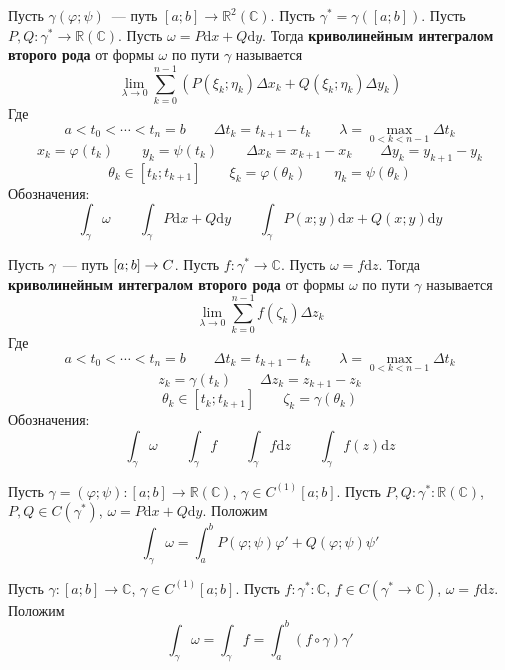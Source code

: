 \documentclass{article}
\begin{document}
    \begin{definition}
        \label{dfn: Удобное определение интеграла вещественной формы}
        Пусть $\gamma(\varphi;\psi)$~--- путь $[a;b]\to\mathbb R^2(\mathbb C)$. Пусть $\gamma^*=\gamma([a;b])$. Пусть $P,Q\colon\gamma^*\to\mathbb R(\mathbb C)$. Пусть $\omega=P\mathrm dx+Q\mathrm dy$. Тогда \textbf{криволинейным интегралом второго рода} от формы $\omega$ по пути $\gamma$ называется
        $$
        \lim\limits_{\lambda\to0}\sum\limits_{k=0}^{n-1}\left(P(\xi_k;\eta_k)\Delta x_k+Q(\xi_k;\eta_k)\Delta y_k\right)
        $$
        Где
        $$
        a<t_0<\cdots<t_n=b\qquad\Delta t_k=t_{k+1}-t_k\qquad\lambda=\max\limits_{0<k<n-1}\Delta t_k
        $$
        $$
        x_k=\varphi(t_k)\qquad y_k=\psi(t_k)\qquad\Delta x_k=x_{k+1}-x_k\qquad\Delta y_k=y_{k+1}-y_k
        $$
        $$
        \theta_k\in[t_k;t_{k+1}]\qquad\xi_k=\varphi(\theta_k)\qquad\eta_k=\psi(\theta_k)
        $$
        Обозначения:
        $$
        \int_\gamma\omega\qquad\int_\gamma P\mathrm dx+Q\mathrm dy\qquad\int_\gamma P(x;y)\mathrm dx+Q(x;y)\mathrm dy
        $$
    \end{definition}
    \begin{definition}
        \label{dfn: Удобное определение интеграла комплексной формы}
        Пусть $\gamma$~--- путь $[a;b]\to\mathbb\mathbb C$. Пусть $f\colon\gamma^*\to\mathbb C$. Пусть $\omega=f\mathrm dz$. Тогда \textbf{криволинейным интегралом второго рода} от формы $\omega$ по пути $\gamma$ называется
        $$
        \lim\limits_{\lambda\to0}\sum\limits_{k=0}^{n-1}f(\zeta_k)\Delta z_k
        $$
        Где
        $$
        a<t_0<\cdots<t_n=b\qquad\Delta t_k=t_{k+1}-t_k\qquad\lambda=\max\limits_{0<k<n-1}\Delta t_k
        $$
        $$
        z_k=\gamma(t_k)\qquad\Delta z_k=z_{k+1}-z_k
        $$
        $$
        \theta_k\in[t_k;t_{k+1}]\qquad\zeta_k=\gamma(\theta_k)
        $$
        Обозначения:
        $$
        \int_\gamma\omega\qquad\int_\gamma f\qquad\int_\gamma f\mathrm dz\qquad\int_\gamma f(z)\mathrm dz
        $$
    \end{definition}
    \begin{definition}
        Пусть $\gamma=(\varphi;\psi)\colon[a;b]\to\mathbb R(\mathbb C)$, $\gamma\in C^{(1)}[a;b]$. Пусть $P,Q\colon\gamma^*\colon\mathbb R(\mathbb C)$, $P,Q\in C(\gamma^*)$, $\omega=P\mathrm dx+Q\mathrm dy$. Положим
        $$
        \int_\gamma\omega=\int_a^bP(\varphi;\psi)\varphi'+Q(\varphi;\psi)\psi'
        $$
    \end{definition}
    \begin{definition}
        Пусть $\gamma\colon[a;b]\to\mathbb C$, $\gamma\in C^{(1)}[a;b]$. Пусть $f\colon\gamma^*\colon\mathbb C$, $f\in C(\gamma^*\to\mathbb C)$, $\omega=f\mathrm dz$. Положим
        $$
        \int_\gamma\omega=\int_\gamma f=\int_a^b(f\circ\gamma)\gamma'
        $$
    \end{definition}
\end{document}

